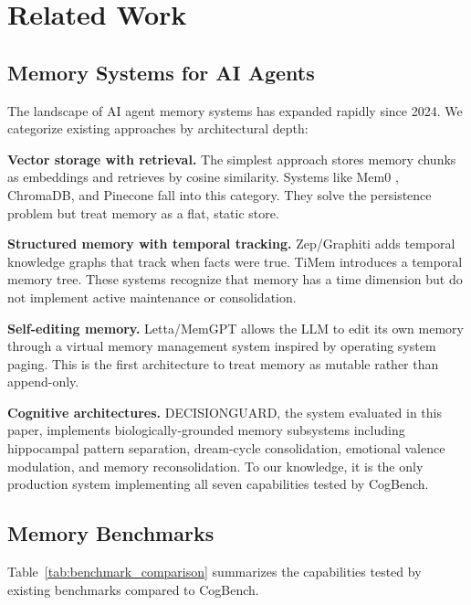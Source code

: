 \documentclass{article}
\begin{document}
\section{Related Work}
\label{sec:related}

\subsection{Memory Systems for AI Agents}

The landscape of AI agent memory systems has expanded rapidly since 2024. We categorize existing approaches by architectural depth:

\textbf{Vector storage with retrieval.} The simplest approach stores memory chunks as embeddings and retrieves by cosine similarity. Systems like Mem0 \citep{mem0}, ChromaDB, and Pinecone fall into this category. They solve the persistence problem but treat memory as a flat, static store.

\textbf{Structured memory with temporal tracking.} Zep/Graphiti \citep{zep2025} adds temporal knowledge graphs that track when facts were true. TiMem \citep{timem2025} introduces a temporal memory tree. These systems recognize that memory has a time dimension but do not implement active maintenance or consolidation.

\textbf{Self-editing memory.} Letta/MemGPT \citep{packer2023memgpt} allows the LLM to edit its own memory through a virtual memory management system inspired by operating system paging. This is the first architecture to treat memory as mutable rather than append-only.

\textbf{Cognitive architectures.} DECISIONGUARD, the system evaluated in this paper, implements biologically-grounded memory subsystems including hippocampal pattern separation, dream-cycle consolidation, emotional valence modulation, and memory reconsolidation. To our knowledge, it is the only production system implementing all seven capabilities tested by CogBench.

\subsection{Memory Benchmarks}

Table~\ref{tab:benchmark_comparison} summarizes the capabilities tested by existing benchmarks compared to CogBench.
\end{document}
